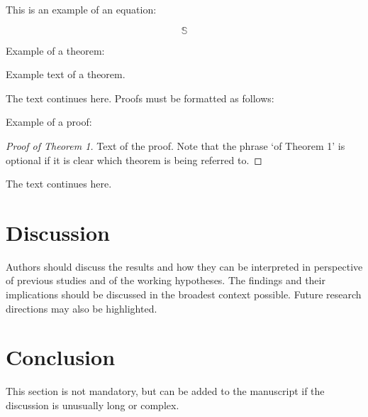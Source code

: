 \documentclass[sensors,article,submit,moreauthors,pdftex]{mdpi}
\begin{document}
This is an example of an equation:

\begin{equation}
\mathbb{S}
\end{equation}

Example of a theorem:

\begin{Theorem}
Example text of a theorem.
\end{Theorem}

The text continues here. Proofs must be formatted as follows:

Example of a proof:

\begin{proof}[Proof of Theorem 1]
Text of the proof. Note that the phrase `of Theorem 1' is optional if it is clear which theorem is being referred to.
\end{proof}

The text continues here.

\section{Discussion}\label{discussion}

Authors should discuss the results and how they can be interpreted in
perspective of previous studies and of the working hypotheses. The
findings and their implications should be discussed in the broadest
context possible. Future research directions may also be highlighted.

\section{Conclusion}\label{conclusion}

This section is not mandatory, but can be added to the manuscript if the
discussion is unusually long or complex.

%

\vspace{6pt}

\end{document}
